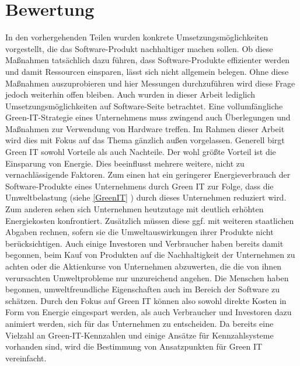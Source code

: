 \documentclass[utf8,biblatex]{lni}
\begin{document}
\section{Bewertung}
In den vorhergehenden Teilen wurden konkrete Umsetzungsmöglichkeiten vorgestellt, die das Software-Produkt nachhaltiger machen sollen. Ob diese Maßnahmen tatsächlich dazu führen, dass Software-Produkte effizienter werden und damit Ressourcen einsparen, lässt sich nicht allgemein belegen. Ohne diese Maßnahmen auszuprobieren und hier Messungen durchzuführen wird diese Frage jedoch weiterhin offen bleiben. \cite{Calero21}
\newline
Auch wurden in dieser Arbeit lediglich Umsetzungsmöglichkeiten auf Software-Seite betrachtet. Eine vollumfängliche Green-IT-Strategie eines Unternehmens muss zwingend auch Überlegungen und Maßnahmen zur Verwendung von Hardware treffen. Im Rahmen dieser Arbeit wird dies mit Fokus auf das Thema gänzlich außen vorgelassen.
\newline
\newline
Generell birgt Green IT sowohl Vorteile als auch Nachteile. Der wohl größte Vorteil ist die Einsparung von Energie. Dies beeinflusst mehrere weitere, nicht zu vernachlässigende Faktoren. Zum einen hat ein geringerer Energieverbrauch der Software-Produkte eines Unternehmens durch Green IT zur Folge, dass die Umweltbelastung (siehe \autoref{GreenIT} ) durch dieses Unternehmen reduziert wird. 
\newline
Zum anderen sehen sich Unternehmen heutzutage mit deutlich erhöhten Energiekosten konfrontiert. Zusätzlich müssen diese ggf. mit weiteren staatlichen Abgaben rechnen, sofern sie die Umweltauswirkungen ihrer Produkte nicht berücksichtigen. Auch einige Investoren und Verbraucher haben bereits damit begonnen, beim Kauf von Produkten auf die Nachhaltigkeit der Unternehmen zu achten oder die Aktienkurse von Unternehmen abzuwerten, die die von ihnen verursachten Umweltprobleme nur unzureichend angehen. Die Menschen haben begonnen, umweltfreundliche Eigenschaften auch im Bereich der Software zu schätzen. \cite{Murugesan08} Durch den Fokus auf Green IT können also sowohl direkte Kosten in Form von Energie eingespart werden, als auch Verbraucher und Investoren dazu animiert werden, sich für das Unternehmen zu entscheiden.
\newline
Da bereits eine Vielzahl an Green-IT-Kennzahlen und einige Ansätze für Kennzahlsysteme vorhanden sind, wird die Bestimmung von Ansatzpunkten für Green IT vereinfacht.
\newline
\end{document}
